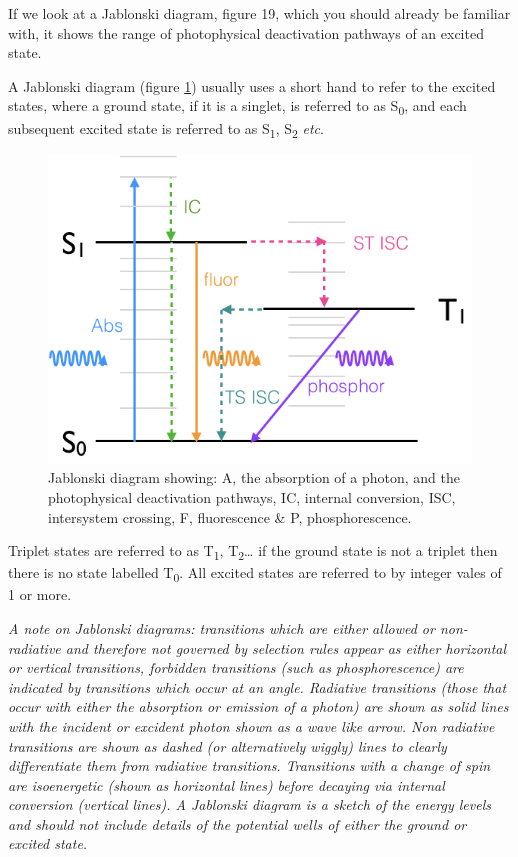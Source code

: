\documentclass[
]{book}
\begin{document}
If we look at a Jablonski diagram, figure 19, which you should already be familiar with, it shows the range of photophysical deactivation pathways of an excited state.

A Jablonski diagram (figure \ref{fig:Jablonski}) usually uses a short hand to refer to the excited states, where a ground state, if it is a singlet, is referred to as S\textsubscript{0}, and each subsequent excited state is referred to as S\textsubscript{1}, S\textsubscript{2} \emph{etc}.

\begin{figure}

{\centering \includegraphics[width=0.7\linewidth]{images/Jablonski} 

}

\caption{Jablonski diagram showing: A, the absorption of a photon, and the photophysical deactivation pathways, IC, internal conversion, ISC, intersystem crossing, F, fluorescence \& P, phosphorescence.}\label{fig:Jablonski}
\end{figure}

Triplet states are referred to as T\textsubscript{1}, T\textsubscript{2}\ldots{} if the ground state is not a triplet then there is no state labelled T\textsubscript{0}. All excited states are referred to by integer vales of 1 or more.

\emph{A note on Jablonski diagrams: transitions which are either allowed or non-radiative and therefore not governed by selection rules appear as either horizontal or vertical transitions, forbidden transitions (such as phosphorescence) are indicated by transitions which occur at an angle. Radiative transitions (those that occur with either the absorption or emission of a photon) are shown as solid lines with the incident or excident photon shown as a wave like arrow. Non radiative transitions are shown as dashed (or alternatively wiggly) lines to clearly differentiate them from radiative transitions. Transitions with a change of spin are isoenergetic (shown as horizontal lines) before decaying via internal conversion (vertical lines). A Jablonski diagram is a sketch of the energy levels and should not include details of the potential wells of either the ground or excited state.}
\end{document}
